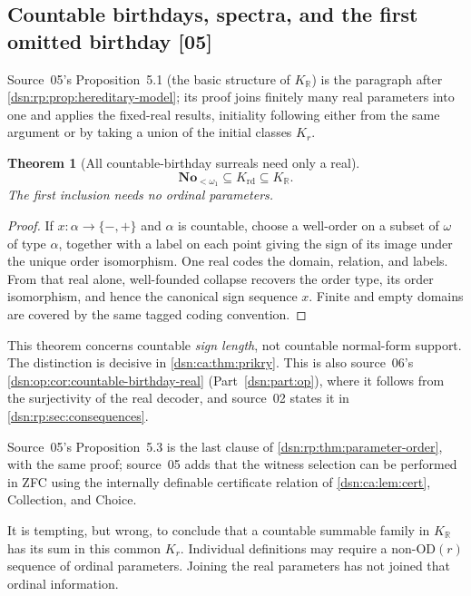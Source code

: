 \documentclass[11pt,a4paper]{article}
\numberwithin{equation}{section}
\newtheorem{theorem}{Theorem}[section]
\theoremstyle{definition}
\theoremstyle{remark}
\newcommand{\No}{\mathbf{No}}
\newcommand{\OD}{\mathrm{OD}}
\newcommand{\R}{\mathbb R}
\newcommand{\src}[1]{\textup{\textsf{\small[#1]}}}
\newcommand{\KR}{K_{\R}}
\begin{document}
\subsection{Countable birthdays, spectra, and the first omitted birthday \src{05}}
\label{dsn:ca:sec:realunion}

Source~05's Proposition~5.1 (the basic structure of $\KR$) is the paragraph
after \cref{dsn:rp:prop:hereditary-model}; its proof joins finitely many real
parameters into one and applies the fixed-real results, initiality following
either from the same argument or by taking a union of the initial classes
$K_r$.

\begin{theorem}[All countable-birthday surreals need only a real]\label{dsn:ca:thm:countbirthday}
\begin{equation}\label{dsn:ca:eq:countbirthday}
 \No_{<\omega_1}\subseteq K_{\mathrm{rd}}\subseteq\KR.
\end{equation}
The first inclusion needs no ordinal parameters.
\end{theorem}
\begin{proof}
If $x:\alpha\to\{-,+\}$ and $\alpha$ is countable, choose a well-order
on a subset of $\omega$ of type $\alpha$, together with a label on each
point giving the sign of its image under the unique order isomorphism.
One real codes the domain, relation, and labels. From that real alone,
well-founded collapse recovers the order type, its order isomorphism,
and hence the canonical sign sequence $x$. Finite and empty domains
are covered by the same tagged coding convention.
\end{proof}

This theorem concerns countable \emph{sign length}, not countable
normal-form support. The distinction is decisive in
\cref{dsn:ca:thm:prikry}.
This is also source~06's \cref{dsn:op:cor:countable-birthday-real} (Part~\ref{dsn:part:op}),
where it follows from the surjectivity of the real decoder, and source~02
states it in \cref{dsn:rp:sec:consequences}.

Source~05's Proposition~5.3 is the last clause of
\cref{dsn:rp:thm:parameter-order}, with the same proof; source~05 adds that the
witness selection can be performed in ZFC using the internally definable
certificate relation of \cref{dsn:ca:lem:cert}, Collection, and Choice.

It is tempting, but wrong, to conclude that a countable summable family
in $\KR$ has its sum in this common $K_r$. Individual definitions may
require a non-$\OD(r)$ sequence of ordinal parameters. Joining the real
parameters has not joined that ordinal information.
\end{document}
